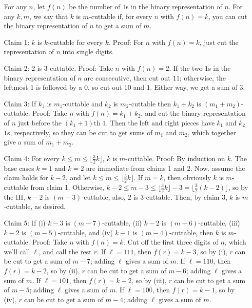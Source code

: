 \documentclass[a4paper]{article}
\begin{document}
\begin{question*}{}
{        For any $n$, let $f(n)$ be the number of $1$s in the binary representation of $n$. For any $k,m$, we say that $k$ is $m$-cuttable if, for every $n$ with $f(n) = k$, you can cut the binary representation of $n$ to get a sum of $m$.

        Claim 1: $k$ is $k$-cuttable for every $k$.
        Proof: For $n$ with $f(n) = k$, just cut the representation of $n$ into single digits.

        Claim 2: $2$ is $3$-cuttable.
        Proof: Take $n$ with $f(n) = 2$. If the two $1$s in the binary representation of $n$ are consecutive, then cut out $11$; otherwise, the leftmost $1$ is followed by a $0$, so cut out $10$ and $1$. Either way, we get a sum of $3$.

        Claim 3: If $k_1$ is $m_1$-cuttable and $k_2$ is $m_2$-cuttable then $k_1+k_2$ is $(m_1+m_2)$-cuttable.
        Proof: Take $n$ with $f(n) = k_1+k_2$, and cut the binary representation of $n$ just before the $(k_1+1)$th $1$. Then the left and right pieces have $k_1$ and $k_2$ $1$s, respectively, so they can be cut to get sums of $m_1$ and $m_2$, which together give a sum of $m_1+m_2$.

        Claim 4: For every $k \leq m \leq \big\lfloor\tfrac{3}{2} k\big\rfloor$, $k$ is $m$-cuttable.
        Proof: By induction on $k$. The base cases $k = 1$ and $k = 2$ are immediate from claims 1 and 2. Now, assume the claim holds for $k - 2$, and let $k \leq m \leq \big\lfloor\tfrac{3}{2} k\big\rfloor$. If $m = k$, then obviously $k$ is $m$-cuttable from claim 1. Otherwise, $k - 2 \leq m - 3 \leq \big\lfloor\tfrac{3}{2} k\big\rfloor - 3 = \big\lfloor\tfrac{3}{2} (k - 2)\big\rfloor$, so by the IH, $k-2$ is $(m-3)$-cuttable; also, $2$ is $3$-cuttable. Then, by claim 3, $k$ is $m$-cuttable, as desired.

        Claim 5: If (i) $k-3$ is $(m-7)$-cuttable, (ii) $k-2$ is $(m-6)$-cuttable, (iii) $k-2$ is $(m-5)$-cuttable, and (iv) $k-1$ is $(m-4)$-cuttable, then $k$ is $m$-cuttable.
        Proof: Take $n$ with $f(n) = k$. Cut off the first three digits of $n$, which we'll call $\ell$, and call the rest $r$.
        If $\ell = 111$, then $f(r) = k-3$, so by (i), $r$ can be cut to get a sum of $m-7$; adding $\ell$ gives a sum of $m$.
        If $\ell = 110$, then $f(r) = k-2$, so by (ii), $r$ can be cut to get a sum of $m-6$; adding $\ell$ gives a sum of $m$.
        If $\ell = 101$, then $f(r) = k-2$, so by (iii), $r$ can be cut to get a sum of $m-5$; adding $\ell$ gives a sum of $m$.
        If $\ell = 100$, then $f(r) = k-1$, so by (iv), $r$ can be cut to get a sum of $m-4$; adding $\ell$ gives a sum of $m$.

}
\end{question*}
\end{document}
